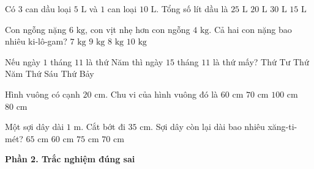 \begin{ex} %
Có $3$ can dầu loại $5\text{ L}$ và $1$ can loại $10\text{ L}$. Tổng số lít dầu là
\choice
{\True $25\text{ L}$}
{$20\text{ L}$}
{$30\text{ L}$}
{$15\text{ L}$}
\end{ex}

\begin{ex} %
Con ngỗng nặng $6\text{ kg}$, con vịt nhẹ hơn con ngỗng $4\text{ kg}$. Cả hai con nặng bao nhiêu ki-lô-gam?
\choice
{$7\text{ kg}$}
{$9\text{ kg}$}
{\True $8\text{ kg}$}
{$10\text{ kg}$}
\end{ex}

\begin{ex} %
Nếu ngày $1$ tháng $11$ là thứ Năm thì ngày $15$ tháng $11$ là thứ mấy?
\choice
{Thứ Tư}
{\True Thứ Năm}
{Thứ Sáu}
{Thứ Bảy}
\end{ex}

\begin{ex} %
Hình vuông có cạnh $20\text{ cm}$. Chu vi của hình vuông đó là
\choice
{$60\text{ cm}$}
{$70\text{ cm}$}
{$100\text{ cm}$}
{\True $80\text{ cm}$}
\end{ex}

\begin{ex} %
Một sợi dây dài $1\text{ m}$. Cắt bớt đi $35\text{ cm}$. Sợi dây còn lại dài bao nhiêu xăng-ti-mét?
\choice
{\True $65\text{ cm}$}
{$60\text{ cm}$}
{$75\text{ cm}$}
{$70\text{ cm}$}
\end{ex}

\textbf{Phần 2. Trắc nghiệm đúng sai}

